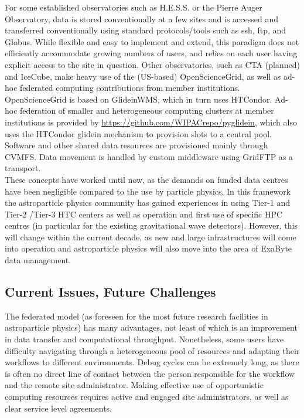  
For some established observatories such as H.E.S.S. or the Pierre Auger Observatory, data is stored conventionally at a few sites and is accessed and transferred conventionally using standard protocols/tools such as ssh, ftp, and Globus. 
While flexible and easy to implement and extend,
this paradigm does not efficiently accommodate growing numbers of users,
and relies on each user having explicit access to the site in question. 
Other observatories, such as CTA (planned) and IceCube, make heavy use of the (US-based) OpenScienceGrid, as well as ad-hoc federated computing contributions from member institutions. 
OpenScienceGrid is based on GlideinWMS, which in turn uses HTCondor. 
Ad-hoc federation of smaller and heterogeneous computing clusters at member institutions is provided by \url{https://github.com/WIPACrepo/pyglidein}, which also uses the HTCondor glidein mechanism to provision slots to a central pool.
Software and other shared data resources are provisioned mainly through
CVMFS. Data movement is handled by custom middleware using GridFTP as a transport. \\

These concepts have worked until now, as the demands on funded data centres have been negligible compared to the use by particle physics.
In this framework the astroparticle physics community has gained experiences in using Tier-1 and Tier-2 /Tier-3 HTC centers as well as operation and first use of specific HPC centres (in particular for the existing gravitational wave detectors).
However, this will change within the current decade, as new and large infrastructures will come into operation and astroparticle physics will also move into the area of ExaByte data management.


\subsection{Current Issues, Future Challenges}

The federated model (as foreseen for the most future research facilities in astroparticle physics) has many advantages, not least of which is an
improvement in data transfer and computational throughput. 
Nonetheless, some users have difficulty navigating through a heterogeneous pool of resources and adapting their workflows to different environments. 
Debug cycles can be extremely long, as there is often no direct line of contact between the person responsible for the workflow and the remote site administrator. 
Making effective use of opportunistic computing resources requires active and engaged site administrators, as well as clear service level agreements.

